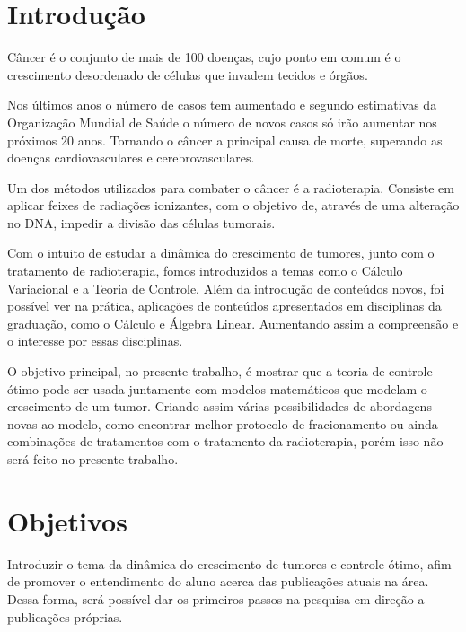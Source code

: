 \documentclass[12pt, a4paper]{article}
\makeatletter
\renewcommand\tableofcontents{
  \null\hfill\textbf{\Large\contentsname}\hfill\null\par
  \@mkboth{\MakeUppercase\contentsname}{\MakeUppercase\contentsname}
  \@starttoc{toc}
}
\makeatother
\begin{document}
 
 \begin{flushleft}
 
\tableofcontents 


\end{flushleft}
\newpage

\section{ Introdução}

Câncer é o conjunto de mais de 100 doenças, cujo ponto em comum é o crescimento desordenado de células que invadem tecidos e órgãos.\

Nos últimos anos o número de casos tem aumentado e segundo estimativas da Organização Mundial de Saúde o número de novos casos só irão aumentar nos próximos 20 anos. Tornando o câncer a principal causa de morte, superando as doenças cardiovasculares e cerebrovasculares. \

Um dos métodos utilizados para combater o câncer é a radioterapia. Consiste em aplicar feixes de radiações ionizantes, com o objetivo de, através de uma alteração no DNA, impedir a divisão das  células tumorais.\

Com o intuito de estudar a dinâmica do crescimento de tumores, junto com o tratamento de radioterapia, fomos introduzidos a temas como o Cálculo Variacional e a Teoria de Controle. Além da introdução de conteúdos novos, foi possível ver na prática, aplicações de conteúdos apresentados em disciplinas da graduação, como o Cálculo e Álgebra Linear. Aumentando assim a compreensão e o interesse por essas disciplinas.\

O objetivo principal, no presente trabalho, é mostrar que a teoria de controle ótimo pode ser usada juntamente com modelos matemáticos que modelam o crescimento de um tumor. Criando assim várias possibilidades  de abordagens novas ao modelo, como encontrar melhor protocolo de fracionamento ou ainda combinações de tratamentos com o tratamento da radioterapia, porém isso não será feito no presente trabalho.

\newpage

\section{Objetivos}
Introduzir o tema da dinâmica do crescimento de tumores e controle ótimo, afim de promover o entendimento do aluno acerca das publicações atuais na área. Dessa forma, será possível dar os primeiros passos na pesquisa em direção a publicações próprias.
\end{document}
